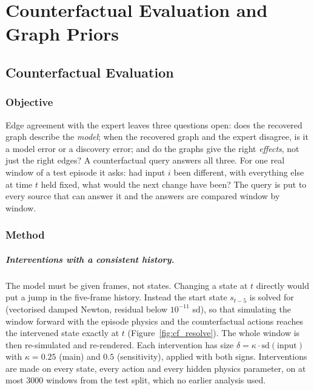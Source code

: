 \documentclass[11pt, a4paper, oneside,enumerate,textcomp]{report}
\begin{document}

\chapter{Counterfactual Evaluation and Graph Priors}
\thispagestyle{empty}

\section{Counterfactual Evaluation}

\subsection{Objective}

Edge agreement with the expert leaves three questions open: does the recovered graph describe the \emph{model}; when the recovered graph and the expert disagree, is it a model error or a discovery error; and do the graphs give the right \emph{effects}, not just the right edges? A counterfactual query answers all three. For one real window of a test episode it asks: had input $i$ been different, with everything else at time $t$ held fixed, what would the next change have been? The query is put to every source that can answer it and the answers are compared window by window.

\subsection{Method}

\paragraph{Interventions with a consistent history.} The model must be given frames, not states. Changing a state at $t$ directly would put a jump in the five-frame history. Instead the start state $s_{t-5}$ is solved for (vectorised damped Newton, residual below $10^{-11}$ sd), so that simulating the window forward with the episode physics and the counterfactual actions reaches the intervened state exactly at $t$ (Figure~\ref{fig:cf_resolve}). The whole window is then re-simulated and re-rendered. Each intervention has size $\delta = \kappa \cdot \mathrm{sd}(\text{input})$ with $\kappa = 0.25$ (main) and $0.5$ (sensitivity), applied with both signs. Interventions are made on every state, every action and every hidden physics parameter, on at most 3000 windows from the test split, which no earlier analysis used.
\end{document}
